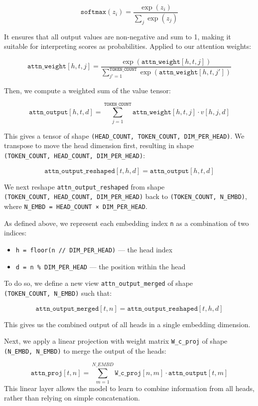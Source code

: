 \documentclass[11pt]{article}
\providecommand{\tightlist}{%
      \setlength{\itemsep}{0pt}\setlength{\parskip}{0pt}}
\begin{document}
\[
\texttt{softmax}(z_i) = \frac{\exp(z_i)}{\sum_j \exp(z_j)}
\]

It ensures that all output values are non-negative and sum to 1, making
it suitable for interpreting scores as probabilities. Applied to our
attention weights:

\[
\texttt{attn\_weight}[h, t, j] = \frac{\exp(\texttt{attn\_weight}[h, t, j])}{\sum_{j'=1}^{\texttt{TOKEN\_COUNT}} \exp(\texttt{attn\_weight}[h, t, j'])}
\]

Then, we compute a weighted sum of the value tensor:

\[
\texttt{attn\_output}[h, t, d] = \sum_{j=1}^{\texttt{TOKEN\_COUNT}} \texttt{attn\_weight}[h, t, j] \cdot v[h, j, d]
\]

This gives a tensor of shape
\texttt{(HEAD\_COUNT,\ TOKEN\_COUNT,\ DIM\_PER\_HEAD)}. We transpose to
move the head dimension first, resulting in shape
\texttt{(TOKEN\_COUNT,\ HEAD\_COUNT,\ DIM\_PER\_HEAD)}:

\[
\texttt{attn\_output\_reshaped}[t, h, d] = \texttt{attn\_output}[h, t, d]
\]

We next reshape \texttt{attn\_output\_reshaped} from shape
\texttt{(TOKEN\_COUNT,\ HEAD\_COUNT,\ DIM\_PER\_HEAD)} back to
\texttt{(TOKEN\_COUNT,\ N\_EMBD)}, where
\texttt{N\_EMBD\ =\ HEAD\_COUNT\ ×\ DIM\_PER\_HEAD}.

As defined above, we represent each embedding index \texttt{n} as a
combination of two indices: 

\begin{itemize}
\tightlist
\item
  \texttt{h\ =\ floor(n\ //\ DIM\_PER\_HEAD)} --- the head index
\item
  \texttt{d\ =\ n\ \%\ DIM\_PER\_HEAD} --- the position within the head
\end{itemize}

To do so, we define a new view \texttt{attn\_output\_merged} of shape
\texttt{(TOKEN\_COUNT,\ N\_EMBD)} such that:

\[
\texttt{attn\_output\_merged}[t, n] = \texttt{attn\_output\_reshaped}[t, h, d]
\]

This gives us the combined output of all heads in a single embedding
dimension.

Next, we apply a linear projection with weight matrix
\texttt{W\_c\_proj} of shape \texttt{(N\_EMBD,\ N\_EMBD)} to merge the
output of the heads:

\[
\texttt{attn\_proj}[t, n] = \sum_{m=1}^{N\_EMBD} \texttt{W\_c\_proj}[n, m] \cdot \texttt{attn\_output}[t, m]
\] This linear layer allows the model to learn to combine information
from all heads, rather than relying on simple concatenation.
\end{document}
